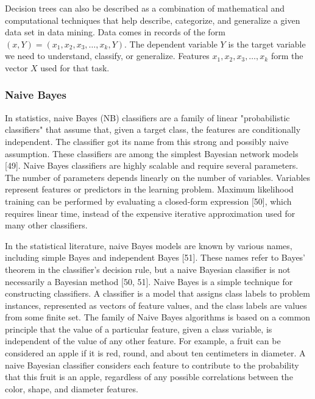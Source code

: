 \documentclass[preprint,12pt]{elsarticle}
\begin{document}
Decision trees can also be described as a combination of mathematical and computational techniques that help describe, categorize, and generalize a given data set in data mining. Data comes in records of the form $(x, Y) = (x_{1}, x_{2}, x_{3}, \ldots, x_{k}, Y)$. The dependent variable $Y$ is the target variable we need to understand, classify, or generalize. Features $x_{1}, x_{2}, x_{3}, \ldots, x_{k}$ form the vector $X$ used for that task.

\subsubsection{Naive Bayes}

In statistics, naive Bayes (NB) classifiers are a family of linear "probabilistic classifiers" that assume that, given a target class, the features are conditionally independent. The classifier got its name from this strong and possibly naive assumption. These classifiers are among the simplest Bayesian network models [49]. Naive Bayes classifiers are highly scalable and require several parameters. The number of parameters depends linearly on the number of variables. Variables represent features or predictors in the learning problem. Maximum likelihood training can be performed by evaluating a closed-form expression [50], which requires linear time, instead of the expensive iterative approximation used for many other classifiers.

In the statistical literature, naive Bayes models are known by various names, including simple Bayes and independent Bayes [51]. These names refer to Bayes' theorem in the classifier's decision rule, but a naive Bayesian classifier is not necessarily a Bayesian method [50, 51]. Naive Bayes is a simple technique for constructing classifiers. A classifier is a model that assigns class labels to problem instances, represented as vectors of feature values, and the class labels are values from some finite set. The family of Naive Bayes algorithms is based on a common principle that the value of a particular feature, given a class variable, is independent of the value of any other feature. For example, a fruit can be considered an apple if it is red, round, and about ten centimeters in diameter. A naive Bayesian classifier considers each feature to contribute to the probability that this fruit is an apple, regardless of any possible correlations between the color, shape, and diameter features.
\end{document}
